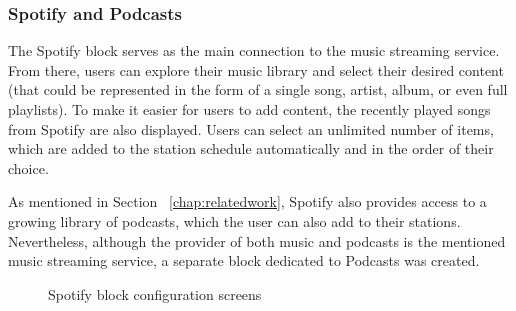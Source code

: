 \newpage
\subsubsection{Spotify and Podcasts}
\label{sub:spotify}

The Spotify block serves as the main connection to the music streaming service. From there, users can explore their music library and select their desired content (that could be represented in the form of a single song, artist, album, or even full playlists). To make it easier for users to add content, the recently played songs from Spotify are also displayed. Users can select an unlimited number of items, which are added to the station schedule automatically and in the order of their choice.

As mentioned in Section ~\ref{chap:relatedwork}, Spotify also provides access to a growing library of podcasts, which the user can also add to their stations. Nevertheless, although the provider of both music and podcasts is the mentioned music streaming service, a separate block dedicated to Podcasts was created.

\begin{figure}[htbp]
	\centering
	 \qquad
	 \qquad
	\caption{Spotify block configuration screens}
	\label{fig:spp1}
\end{figure}

